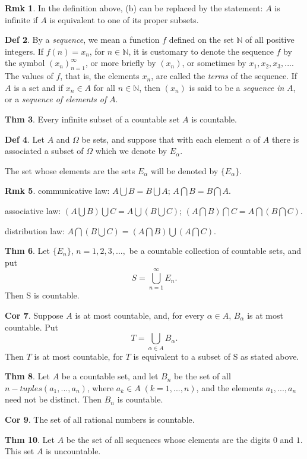 \documentclass{article}
\theoremstyle{definition}
\newtheorem{definition}{Def}
\newtheorem{theorem}[definition]{Thm}
\newtheorem{corollary}[definition]{Cor}
\newtheorem{remarks}[definition]{Rmk}
\begin{document}
\begin{remarks}
    In the definition above, (b) can be replaced by the statement: $A$ is infinite if $A$ is equivalent to one of its proper subsets.
\end{remarks}
\begin{definition}
    By a \textit{sequence}, we mean a function $f$ defined on the set $\mathbb{N}$ of all positive integers. If $f(n)=x_n$, for $n\in \mathbb{N}$, it is customary to denote the sequence $f$ by the symbol $(x_n)_{n=1}^\infty$, or more briefly by $(x_n)$, or sometimes by $x_1, x_2, x_3,...$. The values of $f$, that is, the elements $x_n$, are called the \textit{terms} of the sequence. If $A$ is a set and if $x_n\in A$ for all $n \in \mathbb{N}$, then $(x_n)$ is said to be a \textit{sequence in} $A$, or a \textit{sequence of elements of} $A$.
\end{definition}
\begin{theorem}
    Every infinite subset of a countable set $A$ is countable.
\end{theorem}
\begin{definition}
    Let $A$ and $\Omega$ be sets, and suppose that with each element $\alpha$ of $A$ there is associated a subset of $\Omega$ which we denote by $E_\alpha$.\par
    The set whose elements are the sets $E_\alpha$ will be denoted by $\{E_\alpha\}$.
\end{definition}
\begin{remarks}
    communicative law: $A\bigcup B = B\bigcup A$; $A\bigcap B = B\bigcap A$.\par
    associative law: $(A\bigcup B)\bigcup C = A \bigcup(B\bigcup C)$; $(A\bigcap B)\bigcap C = A\bigcap (B\bigcap C)$.\par
    distribution law: $A\bigcap(B\bigcup C) = (A\bigcap B)\bigcup(A\bigcap C)$.
\end{remarks}
\begin{theorem}
    Let $\{E_n\}$, $n = 1,2,3,...,$ be a countable collection of countable sets, and put
    \[
    S=\bigcup_{n=1}^\infty E_n.
    \]
    Then S is countable.
\end{theorem}
\begin{corollary}
    Suppose $A$ is at most countable, and, for every $\alpha\in A$, $B_\alpha$ is at most countable. Put
    \[
    T=\bigcup_{\alpha\in A} B_\alpha.
    \]
    Then $T$ is at most countable, for $T$ is equivalent to a subset of S as stated above.
\end{corollary}
\begin{theorem}
    Let $A$ be a countable set, and let $B_n$ be the set of all $n-tuples(a_1,..., a_n)$, where $a_k\in A\;(k=1,...,n)$, and the elements $a_1,...,a_n$ need not be distinct. Then $B_n$ is countable.
\end{theorem}
\begin{corollary}
    The set of all rational numbers is countable.
\end{corollary}
\begin{theorem}
    Let $A$ be the set of all sequences whose elements are the digits $0$ and $1$. This set $A$ is uncountable.
\end{theorem}
\end{document}
